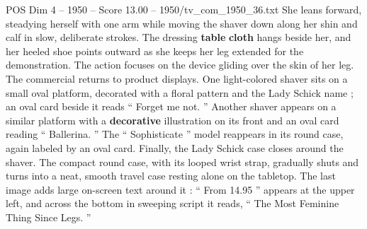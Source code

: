 \begin{textsample}{POS Dim 4 – 1950 – Score 13.00 – 1950/tv\_com\_1950\_36.txt}
She leans forward, steadying herself with one arm while moving the shaver down along her shin and calf in slow, deliberate strokes.
The dressing \textbf{table} \textbf{cloth} hangs beside her, and her heeled shoe points outward as she keeps her leg extended for the demonstration.
The action focuses on the device gliding over the skin of her leg.
The commercial returns to product displays.
One light-colored shaver sits on a small oval platform, decorated with a floral pattern and the Lady Schick name ; an oval card beside it reads “ Forget me not. ” Another shaver appears on a similar platform with a \textbf{decorative} illustration on its front and an oval card reading “ Ballerina. ” The “ Sophisticate ” model reappears in its round case, again labeled by an oval card.
Finally, the Lady Schick case closes around the shaver.
The compact round case, with its looped wrist strap, gradually shuts and turns into a neat, smooth travel case resting alone on the tabletop.
The last image adds large on-screen text around it : “ From 14.95 ” appears at the upper left, and across the bottom in sweeping script it reads, “ The Most Feminine Thing Since Legs. ”

\end{textsample}
